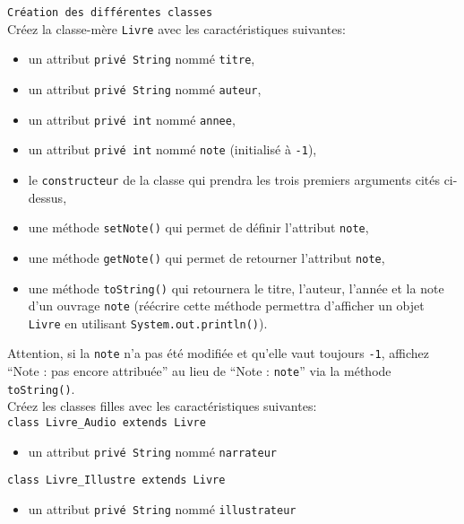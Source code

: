 \begin{Exercice}[20 minutes] \lstinline{Création des différentes classes}\\
Créez la classe-mère \lstinline{Livre} avec les caractéristiques suivantes:
\begin{itemize}
	\item un attribut \lstinline{privé String} nommé \lstinline{titre},
	\item un attribut \lstinline{privé String} nommé \lstinline{auteur},
	\item un attribut \lstinline{privé int} nommé \lstinline{annee},
	\item un attribut \lstinline{privé int} nommé \lstinline{note} (initialisé à \lstinline{-1}),
	\item le \lstinline{constructeur} de la classe qui prendra les trois premiers arguments cités ci-dessus,
	\item une méthode \lstinline{setNote()} qui permet de définir l'attribut \lstinline{note},
	\item une méthode \lstinline{getNote()} qui permet de retourner l'attribut \lstinline{note},
	\item une méthode \lstinline{toString()} qui retournera le titre, l'auteur, l'année et la note d'un ouvrage \lstinline{note} (réécrire cette méthode permettra d'afficher un objet \lstinline{Livre} en utilisant \lstinline{System.out.println()}). \\
\end{itemize}

Attention, si la \lstinline{note} n'a pas été modifiée et qu'elle vaut toujours \lstinline{-1}, affichez ``Note : pas encore attribuée'' au lieu de ``Note : \lstinline{note}'' via la méthode \lstinline{toString()}. \\


Créez les classes filles avec les caractéristiques suivantes:\\
\lstinline{class Livre_Audio extends Livre}
\begin{itemize}
	\item un attribut \lstinline{privé String} nommé \lstinline{narrateur}

\end{itemize}
\lstinline{class Livre_Illustre extends Livre}
\begin{itemize}
	\item un attribut \lstinline{privé String} nommé \lstinline{illustrateur}

\end{itemize}


\end{Exercice}

